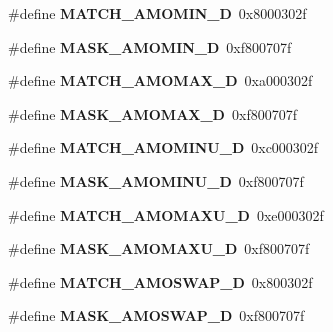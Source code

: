 \begin{DoxyCompactItemize}
\mbox{\label{riscv-utility_8h_a9a233a5d8736db7301e249835c937f6a}} 
\#define {\bfseries M\+A\+T\+C\+H\+\_\+\+A\+M\+O\+M\+I\+N\+\_\+D}~0x8000302f
\item 
\mbox{\label{riscv-utility_8h_ac933b0e3308566836a06cdd16a2f5c0b}} 
\#define {\bfseries M\+A\+S\+K\+\_\+\+A\+M\+O\+M\+I\+N\+\_\+D}~0xf800707f
\item 
\mbox{\label{riscv-utility_8h_a96faa5f354bf3188eb0e3da3583f6a58}} 
\#define {\bfseries M\+A\+T\+C\+H\+\_\+\+A\+M\+O\+M\+A\+X\+\_\+D}~0xa000302f
\item 
\mbox{\label{riscv-utility_8h_ab3ab001f559df80b7088b476ec301a2d}} 
\#define {\bfseries M\+A\+S\+K\+\_\+\+A\+M\+O\+M\+A\+X\+\_\+D}~0xf800707f
\item 
\mbox{\label{riscv-utility_8h_ae7827ec9b5b983c85391cefa4a57588c}} 
\#define {\bfseries M\+A\+T\+C\+H\+\_\+\+A\+M\+O\+M\+I\+N\+U\+\_\+D}~0xc000302f
\item 
\mbox{\label{riscv-utility_8h_a23bc91485664df8fd5b8fdfe521a8c53}} 
\#define {\bfseries M\+A\+S\+K\+\_\+\+A\+M\+O\+M\+I\+N\+U\+\_\+D}~0xf800707f
\item 
\mbox{\label{riscv-utility_8h_af4bc415f68d0c7f81f1e8cb076a9d9cd}} 
\#define {\bfseries M\+A\+T\+C\+H\+\_\+\+A\+M\+O\+M\+A\+X\+U\+\_\+D}~0xe000302f
\item 
\mbox{\label{riscv-utility_8h_a1c5fd98da33b562126175884f00cbb77}} 
\#define {\bfseries M\+A\+S\+K\+\_\+\+A\+M\+O\+M\+A\+X\+U\+\_\+D}~0xf800707f
\item 
\mbox{\label{riscv-utility_8h_a0051711a137f16d91c57d639c21b6c7c}} 
\#define {\bfseries M\+A\+T\+C\+H\+\_\+\+A\+M\+O\+S\+W\+A\+P\+\_\+D}~0x800302f
\item 
\mbox{\label{riscv-utility_8h_a7d5df51768d949ae8e34b71242e50811}} 
\#define {\bfseries M\+A\+S\+K\+\_\+\+A\+M\+O\+S\+W\+A\+P\+\_\+D}~0xf800707f
\item 
\mbox{\label{riscv-utility_8h_a03c21cb608ed12a03c9833bb76eb280e}} 

\end{DoxyCompactItemize}
